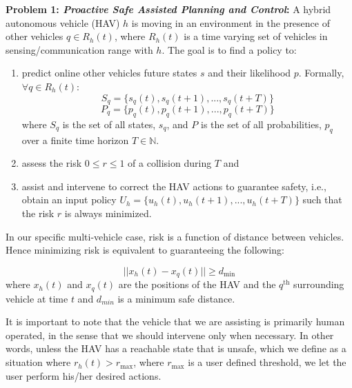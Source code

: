 \documentclass[letterpaper, 10 pt, conference]{ieeeconf}  %
\newcommand\NB[1]{$\spadesuit$\footnote{NB: #1}}
\newcommand{\N}{\mathbb {N}}
\begin{document}
\textbf{Problem 1: \textit{Proactive Safe Assisted Planning and Control}:} 
      A hybrid autonomous vehicle (HAV) $h$ is moving in an environment in the presence of other vehicles $q \in R_h(t)$, where $R_h(t)$ is a time varying set of vehicles in sensing/communication range with $h$. The goal is to find a policy to:
    \begin{enumerate}
        \item  predict online other vehicles future states $s$ and their likelihood $p$. Formally, $\forall q \in R_h(t)$:
    \begin{equation}
   S_q=\{{s_q(t), s_q(t+1),..., s_q(t+T)}\}
       \end{equation}
       \begin{equation}
   P_q=\{{p_q(t), p_q(t+1),..., p_q(t+T)}\}
    \end{equation}
     where $S_q$ is the set of all states, $s_q$, and $P$ is the set of all probabilities, $p_q$ over a finite time horizon $T\in\N$.  
    \item assess the risk $0\leq r \leq1$ of a collision during $T$ and
    \item assist and intervene to correct the HAV actions to guarantee safety, i.e., obtain an input policy $U_h=\{{u_h(t), u_h(t+1),..., u_h(t+T)}\}$ such that the risk $r$ is always minimized. 
    \end{enumerate}
   In our specific multi-vehicle case, risk is a function of distance between vehicles. Hence minimizing risk is equivalent to guaranteeing the following:
    
    \begin{equation}
        ||{x_h(t)-x_q(t)}|| \geq d_{\textrm{min}}
    \end{equation}
     where $x_h(t)$ and $x_q(t)$ are the positions of the HAV and the $q^{\textrm{th}}$ surrounding vehicle at time $t$ and $d_{min}$ is a minimum safe distance.    
    
    It is important to note that the vehicle that we are assisting is primarily human operated, in the sense that we should intervene only when necessary. %
    In other words, unless the HAV has a reachable state that is unsafe, which we define as a situation where $r_h(t)>r_{\max}$, where $r_{\max}$ is a user defined threshold, we let the user perform his/her desired actions.
\end{document}
